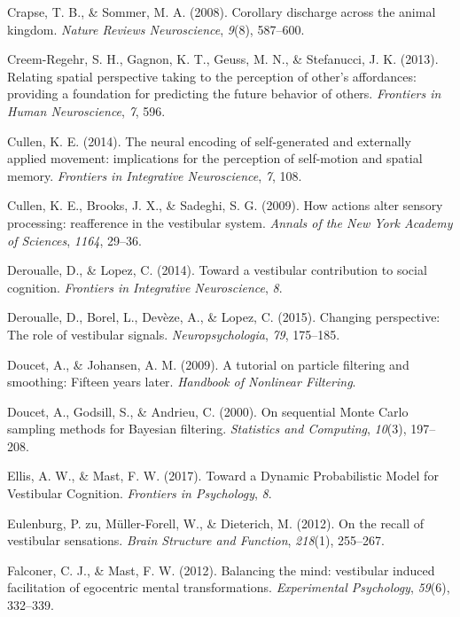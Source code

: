 \documentclass[english,floatsintext,man]{apa6}
\theoremstyle{definition}
\theoremstyle{definition}
\theoremstyle{remark}
\begin{document}
\hypertarget{ref-Crapse:2008jc}{}
Crapse, T. B., \& Sommer, M. A. (2008). Corollary discharge across the
animal kingdom. \emph{Nature Reviews Neuroscience}, \emph{9}(8),
587--600.

\hypertarget{ref-CreemRegehr:2013kx}{}
Creem-Regehr, S. H., Gagnon, K. T., Geuss, M. N., \& Stefanucci, J. K.
(2013). Relating spatial perspective taking to the perception of other's
affordances: providing a foundation for predicting the future behavior
of others. \emph{Frontiers in Human Neuroscience}, \emph{7}, 596.

\hypertarget{ref-Cullen:2014gx}{}
Cullen, K. E. (2014). The neural encoding of self-generated and
externally applied movement: implications for the perception of
self-motion and spatial memory. \emph{Frontiers in Integrative
Neuroscience}, \emph{7}, 108.

\hypertarget{ref-Cullen:2009dc}{}
Cullen, K. E., Brooks, J. X., \& Sadeghi, S. G. (2009). How actions
alter sensory processing: reafference in the vestibular system.
\emph{Annals of the New York Academy of Sciences}, \emph{1164}, 29--36.

\hypertarget{ref-Deroualle:2014ho}{}
Deroualle, D., \& Lopez, C. (2014). Toward a vestibular contribution to
social cognition. \emph{Frontiers in Integrative Neuroscience},
\emph{8}.

\hypertarget{ref-Deroualle:2015gk}{}
Deroualle, D., Borel, L., Devèze, A., \& Lopez, C. (2015). Changing
perspective: The role of vestibular signals. \emph{Neuropsychologia},
\emph{79}, 175--185.

\hypertarget{ref-Doucet:2009us}{}
Doucet, A., \& Johansen, A. M. (2009). A tutorial on particle filtering
and smoothing: Fifteen years later. \emph{Handbook of Nonlinear
Filtering}.

\hypertarget{ref-Doucet:2000bh}{}
Doucet, A., Godsill, S., \& Andrieu, C. (2000). On sequential Monte
Carlo sampling methods for Bayesian filtering. \emph{Statistics and
Computing}, \emph{10}(3), 197--208.

\hypertarget{ref-Ellis:2017fg}{}
Ellis, A. W., \& Mast, F. W. (2017). Toward a Dynamic Probabilistic
Model for Vestibular Cognition. \emph{Frontiers in Psychology},
\emph{8}.

\hypertarget{ref-zuEulenburg:2012bh}{}
Eulenburg, P. zu, Müller-Forell, W., \& Dieterich, M. (2012). On the
recall of vestibular sensations. \emph{Brain Structure and Function},
\emph{218}(1), 255--267.

\hypertarget{ref-Falconer:2012cl}{}
Falconer, C. J., \& Mast, F. W. (2012). Balancing the mind: vestibular
induced facilitation of egocentric mental transformations.
\emph{Experimental Psychology}, \emph{59}(6), 332--339.
\end{document}
